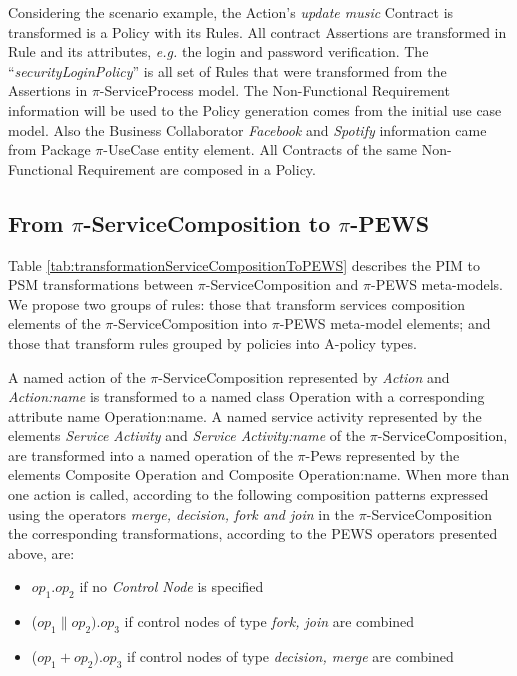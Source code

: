 \begin{exampl}
Considering the scenario example, the {\sc
Action}'s \textit{update music} {\sc Contract} is transformed is a {\sc Policy}
with its {\sc Rules}. All contract {\sc Assertions} are transformed in {\sc
Rule} and its attributes, \textit{e.g.} the login and password verification.  The
``\textit{securityLoginPolicy}'' is all set of {\sc Rules} that were transformed
from the {\sc Assertions} in $\pi$-ServiceProcess model. The {\sc Non-Functional
Requirement} information will be used to the {\sc Policy} generation comes from
the initial use case model. Also the {\sc Business Collaborator}
\textit{Facebook} and \textit{Spotify} information came from {\sc Package}
$\pi$-UseCase entity element. All {\sc Contracts} of the same {\sc
Non-Functional Requirement} are composed in a {\sc Policy}.
\end{exampl}



\subsection{From $\pi$-ServiceComposition to
$\pi$-PEWS}


Table \ref{tab:transformationServiceCompositionToPEWS} describes the PIM to PSM
transformations between $\pi$-ServiceComposition and $\pi$-PEWS meta-models. We
propose two groups of rules: those that transform services composition
elements of the $\pi$-ServiceComposition into $\pi$-PEWS meta-model elements;
and those that transform rules grouped by policies into A-policy types.

A named action of the $\pi$-ServiceComposition represented by  {\sc\em Action}
and {\sc\em Action:name} is transformed to a  named class {\sc Operation} with a
corresponding attribute name {\sc Operation:name}. A  named service activity
represented by the elements {\sc\em Service Activity}  and  {\sc\em
Service Activity:name} of the $\pi$-ServiceComposition, are  transformed into a
named operation of the $\pi$-{\sc Pews} represented by the elements  {\sc
Composite Operation} and {\sc Composite Operation:name}. When more than one action
is called, according to the following  composition patterns expressed using the
operators {\sc\em merge, decision, fork and join} in the $\pi$-ServiceComposition
the corresponding transformations, according to the PEWS operators presented
above, are:
\begin{itemize}
\item   $op_1 . op_2$ if no {\sc\em Control Node} is specified
\item ($op_1 \parallel op_2) . op_3$ if control nodes of type {\sc\em fork, join} are combined
\item ($op_1 + op_2) . op_3$ if control nodes of type {\sc\em decision, merge} are combined
\end{itemize}

